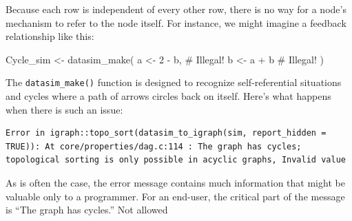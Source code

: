 \documentclass[
  letterpaper,
  DIV=11,
  numbers=noendperiod,
  oneside]{scrartcl}
\newenvironment{Shaded}{\begin{snugshade}}{\end{snugshade}}
\newcommand{\CommentTok}[1]{\textcolor[rgb]{0.37,0.37,0.37}{#1}}
\newcommand{\DecValTok}[1]{\textcolor[rgb]{0.68,0.00,0.00}{#1}}
\newcommand{\FunctionTok}[1]{\textcolor[rgb]{0.28,0.35,0.67}{#1}}
\newcommand{\NormalTok}[1]{\textcolor[rgb]{0.00,0.23,0.31}{#1}}
\newcommand{\OtherTok}[1]{\textcolor[rgb]{0.00,0.23,0.31}{#1}}
\newcommand{\SpecialCharTok}[1]{\textcolor[rgb]{0.37,0.37,0.37}{#1}}
\begin{document}
Because each row is independent of every other row, there is no way for
a node's mechanism to refer to the node itself. For instance, we might
imagine a feedback relationship like this:

\begin{Shaded}
\begin{Highlighting}[]
\NormalTok{Cycle\_sim }\OtherTok{\textless{}{-}} \FunctionTok{datasim\_make}\NormalTok{(}
\NormalTok{  a }\OtherTok{\textless{}{-}} \DecValTok{2} \SpecialCharTok{{-}}\NormalTok{ b, }\CommentTok{\# Illegal!}
\NormalTok{  b }\OtherTok{\textless{}{-}}\NormalTok{ a }\SpecialCharTok{+}\NormalTok{ b  }\CommentTok{\# Illegal!}
\NormalTok{)}
\end{Highlighting}
\end{Shaded}

The \texttt{datasim\_make()} function is designed to recognize
self-referential situations and cycles where a path of arrows circles
back on itself. Here's what happens when there is such an issue:

\begin{verbatim}
Error in igraph::topo_sort(datasim_to_igraph(sim, report_hidden = TRUE)): At core/properties/dag.c:114 : The graph has cycles; topological sorting is only possible in acyclic graphs, Invalid value
\end{verbatim}

As is often the case, the error message contains much information that
might be valuable only to a programmer. For an end-user, the critical
part of the message is ``The graph has cycles.'' Not allowed
\end{document}
